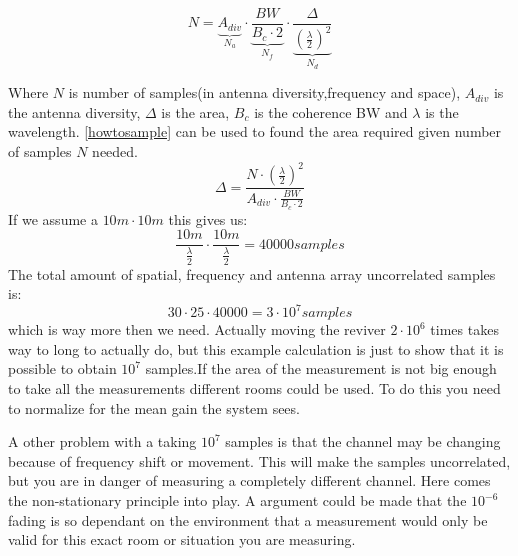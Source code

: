 \begin{equation}
N = \underbrace{A_{div}}_\text{$N_a$} \cdot \underbrace{\frac{BW}{B_c \cdot 2}}_\text{$N_f$} \cdot \underbrace{\frac{\Delta}{(\frac{\lambda}{2})^2}}_\text{$N_d$}
\label{howtosample}
\end{equation} 
 
Where $N$ is number of samples(in antenna diversity,frequency and space), $A_{div}$ is the antenna diversity, $\Delta$ is the area, $B_c$ is the coherence BW and $\lambda$ is the wavelength.
\autoref{howtosample} can be used to found the area required given number of samples $N$ needed.
\begin{equation}
\Delta  = \frac{N\cdot (\frac{\lambda}{2})^2}{A_{div}\cdot \frac{BW}{B_c \cdot 2}}
\label{howtosqaure}
\end{equation}
If we assume a $10m \cdot 10m$ this gives us: 
\begin{equation}
\frac{10m}{\frac{\lambda}{2}} \cdot \frac{10m}{\frac{\lambda}{2}}  = 40000 samples
\end{equation}
The total amount of spatial, frequency and antenna array uncorrelated samples is:
\begin{equation}
30 \cdot 25 \cdot 40000 = 3 \cdot 10^7 samples
\end{equation}
which is way more then we need.
Actually moving the reviver $2 \cdot 10^6$ times takes way to long to actually do, but this example calculation is just to show that it is possible to obtain $10^7$ samples.If the area of the measurement is not big enough to take all the measurements different rooms could be used. To do this you need to normalize for the mean gain the system sees. 

A other problem with a taking $10^7$ samples is that the channel may be changing because of frequency shift or movement. This will make the samples uncorrelated, but you are in danger of measuring a completely different channel. Here comes the non-stationary principle into play. A argument could be made that the $10^{-6}$ fading is so dependant on the environment that a measurement would only be valid for this exact room or situation you are measuring.

